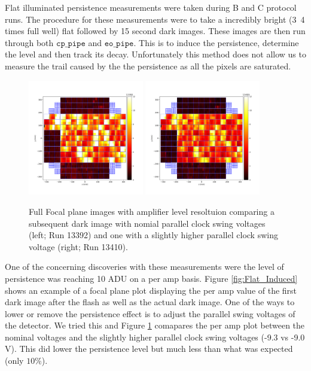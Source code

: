\documentclass[DM,authoryear,toc]{lsstdoc}
\begin{document}
Flat illuminated persistence measurements were taken during B and C protocol runs.
The procedure for these measurements were to take a incredibly bright (3~4 times full well) flat followed by 15 second dark images.
These images are then run through both $\texttt{cp_pipe}$ and $\texttt{eo_pipe}$.
This is to induce the persistence, determine the level and then track its decay.
Unfortunately this method does not allow us to measure the trail caused by the the persistence as all the pixels are saturated.

\begin{figure}[!htp]
  \centering
  \includegraphics[width=0.45\textwidth, angle=0]{Run_13392_Persistence.png}
  \includegraphics[width=0.45\textwidth, angle=0]{Run_13410_Persistence_Lower.png}
  \caption{
  Full Focal plane images with amplifier level resoltuion comparing a subsequent dark image with nomial parallel clock swing voltages (left; Run 13392) 
  and one with a slightly higher parallel clock swing voltage (right; Run 13410).
  }\label{fig:Flat_Induced_Comparison}
\end{figure}

One of the concerning discoveries with these measurements were the level of persistence was reaching 10 ADU on a per amp basis.
Figure \ref{fig:Flat_Induced} shows an example of a focal plane plot displaying the per amp value of the first dark image after the flash as well as the actual dark image.
One of the ways to lower or remove the persistence effect is to adjust the parallel swing voltages of the detector.
We tried this and Figure \ref{fig:Flat_Induced_Comparison} comapares the per amp plot between the nominal voltages and the slightly higher parallel clock swing voltages (-9.3 vs -9.0 V).
This did lower the persistence level but much less than what was expected (only $10\%$).
\end{document}
